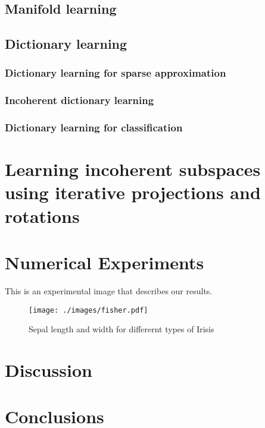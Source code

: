 \documentclass[]{article}
\begin{document}
\subsection{Manifold learning}
\label{sec-2-2}
\subsection{Dictionary learning}
\label{sec-2-3}
\subsubsection{Dictionary learning for sparse approximation}
\label{sec-2-3-1}
\subsubsection{Incoherent dictionary learning}
\label{sec-2-3-2}
\subsubsection{Dictionary learning for classification}
\label{sec-2-3-3}

\section{Learning incoherent subspaces using iterative projections and rotations}
\label{sec-3}
\section{Numerical Experiments}
\label{sec-4}
This is an experimental image that describes our results.
\begin{figure}[htb]
\centering
\texttt{[image: ./images/fisher.pdf]}
\caption{\label{fig:Iris}Sepal length and width for differernt types of Irisis}
\end{figure}
\section{Discussion}
\label{sec-5}
\section{Conclusions}
\label{sec-6}



\end{document}

